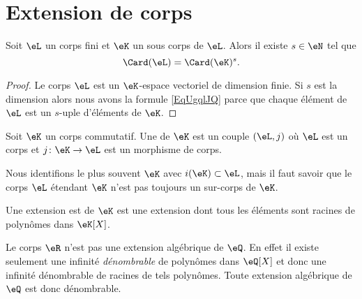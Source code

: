 
\section{Extension de corps}
\label{SECooLQVJooTGeqiR}

\begin{lemma}       \label{LemobATFP}
    Soit \( \eL\) un corps fini et \( \eK\) un sous corps de \( \eL\). Alors il existe \( s\in \eN\) tel que
    \begin{equation}        \label{EqUgqlJQ}
        \Card(\eL)=\Card(\eK)^s.
    \end{equation}
\end{lemma}

\begin{proof}
    Le corps \( \eL\) est un \( \eK\)-espace vectoriel de dimension finie. Si \( s\) est la dimension alors nous avons la formule \eqref{EqUgqlJQ} parce que chaque élément de \( \eL\) est un \( s\)-uple d'éléments de \( \eK\).
\end{proof}

\begin{definition}     \label{DEFooFLJJooGJYDOe}
    Soit \( \eK\) un corps commutatif. Une  de \( \eK\) est un couple \( (\eL,j)\) où \( \eL\) est un corps et \( j\colon \eK\to \eL\) est un morphisme de corps.
\end{definition}

    Nous identifions le plus souvent \( \eK\) avec \( i(\eK)\subset \eL\), mais il faut savoir que le corps \( \eL\) étendant \( \eK\) n'est pas toujours un sur-corps de \( \eK\).

\begin{definition}      \label{DEFooREUHooLVwRuw}
    Une extension est  de \( \eK\) est une extension dont tous les éléments sont racines de polynômes dans \( \eK[X]\).
\end{definition}

\begin{example}
    Le corps \( \eR\) n'est pas une extension algébrique de \( \eQ\). En effet il existe seulement une infinité \emph{dénombrable} de polynômes dans \( \eQ[X]\) et donc une infinité dénombrable de racines de tels polynômes. Toute extension algébrique de \( \eQ\) est donc dénombrable.
\end{example}

